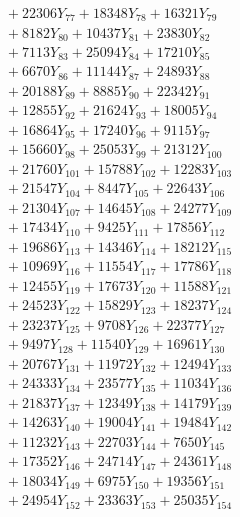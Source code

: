 \documentclass[a4paper,10pt]{article}
\begin{document}
{\begin{align}
&\;  + 22306 Y_{77} + 18348 Y_{78} + 16321 Y_{79} \\[0.3ex]
&\;  + 8182 Y_{80} + 10437 Y_{81} + 23830 Y_{82} \\[0.3ex]
&\;  + 7113 Y_{83} + 25094 Y_{84} + 17210 Y_{85} \\[0.3ex]
&\;  + 6670 Y_{86} + 11144 Y_{87} + 24893 Y_{88} \\[0.5ex]\allowbreak
&\;  + 20188 Y_{89} + 8885 Y_{90} + 22342 Y_{91} \\[0.3ex]
&\;  + 12855 Y_{92} + 21624 Y_{93} + 18005 Y_{94} \\[0.3ex]
&\;  + 16864 Y_{95} + 17240 Y_{96} + 9115 Y_{97} \\[0.3ex]
&\;  + 15660 Y_{98} + 25053 Y_{99} + 21312 Y_{100} \\[0.3ex]
&\;  + 21760 Y_{101} + 15788 Y_{102} + 12283 Y_{103} \\[0.3ex]
&\;  + 21547 Y_{104} + 8447 Y_{105} + 22643 Y_{106} \\[0.3ex]
&\;  + 21304 Y_{107} + 14645 Y_{108} + 24277 Y_{109} \\[0.3ex]
&\;  + 17434 Y_{110} + 9425 Y_{111} + 17856 Y_{112} \\[0.3ex]
&\;  + 19686 Y_{113} + 14346 Y_{114} + 18212 Y_{115} \\[0.3ex]
&\;  + 10969 Y_{116} + 11554 Y_{117} + 17786 Y_{118} \\[0.5ex]\allowbreak
&\;  + 12455 Y_{119} + 17673 Y_{120} + 11588 Y_{121} \\[0.3ex]
&\;  + 24523 Y_{122} + 15829 Y_{123} + 18237 Y_{124} \\[0.3ex]
&\;  + 23237 Y_{125} + 9708 Y_{126} + 22377 Y_{127} \\[0.3ex]
&\;  + 9497 Y_{128} + 11540 Y_{129} + 16961 Y_{130} \\[0.3ex]
&\;  + 20767 Y_{131} + 11972 Y_{132} + 12494 Y_{133} \\[0.3ex]
&\;  + 24333 Y_{134} + 23577 Y_{135} + 11034 Y_{136} \\[0.3ex]
&\;  + 21837 Y_{137} + 12349 Y_{138} + 14179 Y_{139} \\[0.3ex]
&\;  + 14263 Y_{140} + 19004 Y_{141} + 19484 Y_{142} \\[0.3ex]
&\;  + 11232 Y_{143} + 22703 Y_{144} + 7650 Y_{145} \\[0.3ex]
&\;  + 17352 Y_{146} + 24714 Y_{147} + 24361 Y_{148} \\[0.5ex]\allowbreak
&\;  + 18034 Y_{149} + 6975 Y_{150} + 19356 Y_{151} \\[0.3ex]
&\;  + 24954 Y_{152} + 23363 Y_{153} + 25035 Y_{154} \\[0.3ex]

\end{align}}
\end{document}
